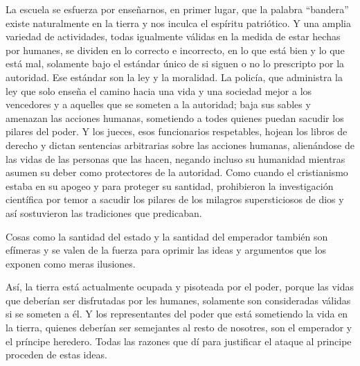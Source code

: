 \documentclass[
]{book}
\begin{document}
La escuela se esfuerza por enseñarnos, en primer lugar, que la palabra ``bandera'' existe naturalmente en la tierra y nos inculca el espíritu patriótico. Y una amplia variedad de actividades, todas igualmente válidas en la medida de estar hechas por humanes, se dividen en lo correcto e incorrecto, en lo que está bien y lo que está mal, solamente bajo el estándar único de si siguen o no lo prescripto por la autoridad. Ese estándar son la ley y la moralidad.
La policía, que administra la ley que solo enseña el camino hacia una vida y una sociedad mejor a los vencedores y a aquelles que se someten a la autoridad; baja sus sables y amenazan las acciones humanas, sometiendo a todes quienes puedan sacudir los pilares del poder. Y los jueces, esos funcionarios respetables, hojean los libros de derecho y dictan sentencias arbitrarias sobre las acciones humanas, alienándose de las vidas de las personas que las hacen, negando incluso su humanidad mientras asumen su deber como protectores de la autoridad.
Como cuando el cristianismo estaba en su apogeo y para proteger su santidad, prohibieron la investigación científica por temor a sacudir los pilares de los milagros supersticiosos de dios y así sostuvieron las tradiciones que predicaban.

Cosas como la santidad del estado y la santidad del emperador también son efímeras y se valen de la fuerza para oprimir las ideas y argumentos que los exponen como meras ilusiones.

Así, la tierra está actualmente ocupada y pisoteada por el poder, porque las vidas que deberían ser disfrutadas por les humanes, solamente son consideradas válidas si se someten a él.
Y los representantes del poder que está sometiendo la vida en la tierra, quienes deberían ser semejantes al resto de nosotres, son el emperador y el príncipe heredero. Todas las razones que dí para justificar el ataque al principe proceden de estas ideas.
\end{document}
